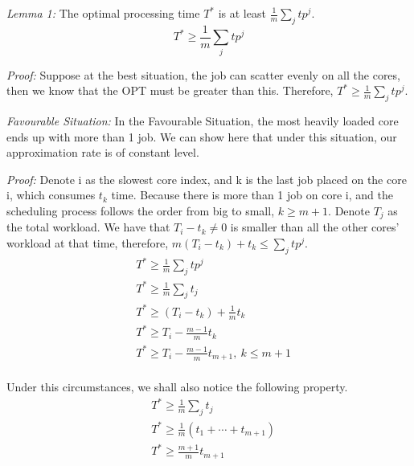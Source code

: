 \documentclass{article}
\begin{document}
    \textit{Lemma 1:} The optimal processing time $T^*$ is at least $\frac{1}{m}\sum_j tp^j$.
    \begin{equation}
        T^* \geq \frac{1}{m}\sum_j tp^j
    \end{equation}
    
    \textit{Proof:} Suppose at the best situation, the job can scatter evenly on all the cores, then we know that the OPT must be greater than this. Therefore, $T^* \geq \frac{1}{m} \sum_j tp^j$.
    
    
    \textit{Favourable Situation:} In the Favourable Situation, the most heavily loaded core ends up with more than 1 job. We can show here that under this situation, our approximation rate is of constant level.
    
    \textit{Proof:} Denote i as the slowest core index, and k is the last job placed on the core i, which consumes $t_k$ time. Because there is more than 1 job on core i, and the scheduling process follows the order from big to small, $k \geq m+1$.
    Denote $T_j$ as the total workload. We have that $T_i - t_k \neq 0$ is smaller than all the other cores' workload at that time, therefore, $m(T_i - t_k) + t_k \leq \sum_j tp^j$. 
    \begin{equation}
        \begin{aligned}
            &T^* \geq \frac{1}{m}\sum_j tp^j\\
            &T^* \geq \frac{1}{m}\sum_j t_j\\
            &T^* \geq(T_i - t_k) + \frac{1}{m} t_k \\
            &T^* \geq T_i -  \frac{m-1}{m} t_k \\
            &T^* \geq T_i -  \frac{m-1}{m} t_{m+1},\ k\leq m+1 \\
        \end{aligned}
        \label{pre 1.3.1.1}
    \end{equation}
    
    Under this circumstances, we shall also notice the following property.
    \begin{equation}
        \begin{aligned}
            &T^* \geq \frac{1}{m}\sum_j t_j\\
            &T^* \geq \frac{1}{m}(t_1 + \cdots + t_{m+1})\\
            &T^* \geq \frac{m+1}{m}t_{m+1}\\
        \end{aligned}
        \label{pre 1.3.1.2}
    \end{equation}
    
\end{document}
